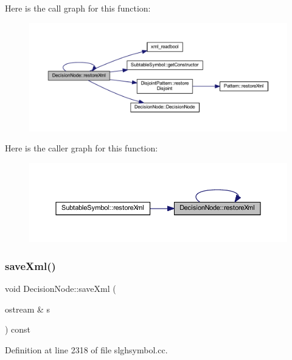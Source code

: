 Here is the call graph for this function\+:
\nopagebreak
\begin{figure}[H]
\begin{center}
\leavevmode
\includegraphics[width=350pt]{class_decision_node_a6b8d14fdf942a38107cb1633f5065202_cgraph}
\end{center}
\end{figure}
Here is the caller graph for this function\+:
\nopagebreak
\begin{figure}[H]
\begin{center}
\leavevmode
\includegraphics[width=350pt]{class_decision_node_a6b8d14fdf942a38107cb1633f5065202_icgraph}
\end{center}
\end{figure}
\mbox{\label{class_decision_node_a2c1fb2500eafcafeb80c29bd44450c09}} 
\subsubsection{\texorpdfstring{saveXml()}{saveXml()}}
{\footnotesize\ttfamily void Decision\+Node\+::save\+Xml (\begin{DoxyParamCaption}\item[{ostream \&}]{s }\end{DoxyParamCaption}) const}



Definition at line 2318 of file slghsymbol.\+cc.

